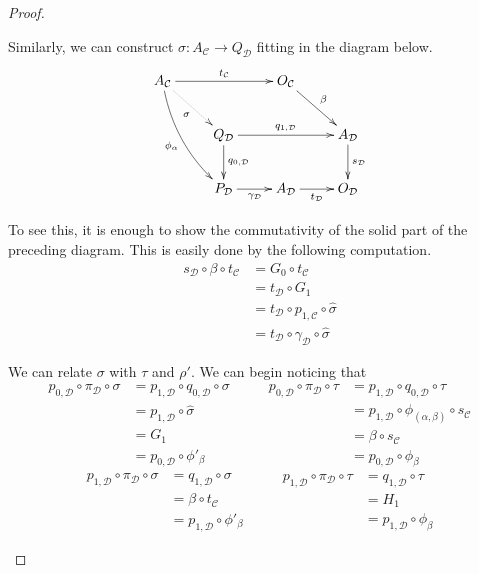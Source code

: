 \documentclass[a4paper,UKenglish,cleveref,pdftex,thm-restate,numberwithinsect]{lipics-v2021}
\begin{document}
\begin{proof}
\begin{enumerate}
\begin{itemize}
			Similarly, we can construct $\sigma \colon A_{\mathcal{C}}\to Q_{\mathcal{D}}$ fitting in the diagram below.
					 \[\xymatrix{  A_{\mathcal{C}} \ar@/_.3cm/[ddr]_{\phi_{\alpha}} \ar[rr]^{t_{\mathcal{C}}} \ar@{.>}[dr]_{\sigma}&& O_{\mathcal{C}} \ar[dr]^{\beta}\\& Q_{\mathcal{D}} \ar[rr]^{q_{1, \mathcal{D}}}  \ar[d]^{q_{0, \mathcal{D}}} & & A_{\mathcal{D}} \ar[d]^{s_{\mathcal{D}}} \\ &   P_{\mathcal{D}} \ar[r]_{\gamma_{\mathcal{D}}}& A_{\mathcal{D}} \ar[r]_{t_{\mathcal{D}}} & O_{\mathcal{D}} }\]
			
			To see this, it is enough to show the commutativity of the solid part of the preceding diagram. This is easily done by the following computation. 
				 \begin{align*}
			s_{\mathcal{D}}\circ \beta \circ t_{\mathcal{C}}&=G_0\circ t_{\mathcal{C}}
	\\&=
			t_{\mathcal{D}}\circ G_1
			\\&=
			t_{\mathcal{D}}\circ p_{1, \mathcal{C}} \circ \hat{\sigma}
			\\&=
				t_{\mathcal{D}}\circ \gamma_{\mathcal{D}}\circ \hat{\sigma}			\end{align*}
			
			We can relate $\sigma$ with $\tau$ and $\rho'$. We can begin noticing that
			\[\begin{split}
				p_{0, \mathcal{D}}\circ \pi_{\mathcal{D}}\circ \sigma &= p_{1, \mathcal{D}}\circ q_{0, \mathcal{D}}\circ \sigma \\&=p_{1, \mathcal{D}} \circ \hat{\sigma}\\&=G_1	\\&=p_{0, \mathcal{D}}\circ  \phi'_{\beta} 
			\end{split} \qquad\begin{split}
			p_{0, \mathcal{D}}\circ \pi_{\mathcal{D}}\circ \tau &= p_{1, \mathcal{D}}\circ q_{0, \mathcal{D}}\circ \tau \\&=p_{1, \mathcal{D}} \circ \phi_{(\alpha, \beta)} \circ s_{\mathcal{C}}\\&=\beta	\circ s_{\mathcal{C}} \\&=p_{0, \mathcal{D}} \circ \phi_{\beta} 
			\end{split} \] 
			\[\begin{split}	p_{1, \mathcal{D}}\circ \pi_{\mathcal{D}}\circ \sigma &=  q_{1, \mathcal{D}}\circ \sigma \\&=\beta \circ t_{\mathcal{C}}\\&=p_{1, \mathcal{D}}\circ  \phi'_{\beta} \end{split} \qquad \begin{split}
			p_{1, \mathcal{D}}\circ \pi_{\mathcal{D}}\circ \tau &=  q_{1, \mathcal{D}}\circ \tau \\&=H_1 \\&=p_{1, \mathcal{D}} \circ \phi_{\beta}
			\end{split} \]
			

\end{itemize}
\end{enumerate}
\end{proof}
\end{document}
